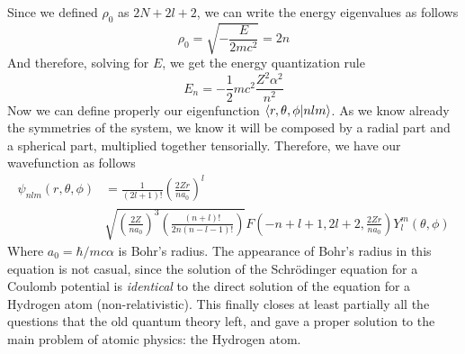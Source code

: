 \documentclass[../qm.tex]{subfiles}
\begin{document}
	Since we defined $\rho_0$ as $2N+2l+2$, we can write the energy eigenvalues as follows
	\begin{equation*}
		\rho_0=\sqrt{-\frac{E}{2mc^2}}=2n
	\end{equation*}
	And therefore, solving for $E$, we get the energy quantization rule
	\begin{equation}
		E_n=-\frac{1}{2}mc^2\frac{Z^2\alpha^2}{n^2}
		\label{eq:energyquant1}
	\end{equation}
	Now we can define properly our eigenfunction $\bra{r,\theta,\phi}\ket{nlm}$. As we know already the symmetries of the system, we know it will be composed by a radial part and a spherical part, multiplied together tensorially. Therefore, we have our wavefunction as follows
	\begin{equation}
		\begin{aligned}
		\psi_{nlm}(r,\theta,\phi)&=\frac{1}{(2l+1)!}\left( \frac{2Zr}{na_0} \right)^l\\
		&\sqrt{\left( \frac{2Z}{na_0}\right)^3\left(\frac{(n+l)!}{2n(n-l-1)!} \right)}F\left( -n+l+1,2l+2,\frac{2Zr}{na_0} \right)Y^m_l(\theta,\phi)
		\end{aligned}
		\label{eq:wavefunc}
	\end{equation}
	Where $a_0=\hbar/mc\alpha$ is Bohr's radius. The appearance of Bohr's radius in this equation is not casual, since the solution of the Schrödinger equation for a Coulomb potential is \emph{identical} to the direct solution of the equation for a Hydrogen atom (non-relativistic). This finally closes at least partially all the questions that the old quantum theory left, and gave a proper solution to the main problem of atomic physics: the Hydrogen atom.
\end{document}
